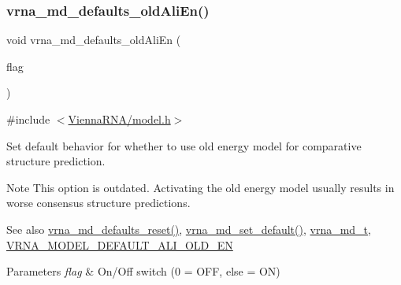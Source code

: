 \subsubsection{\texorpdfstring{vrna\+\_\+md\+\_\+defaults\+\_\+old\+Ali\+En()}{vrna\_md\_defaults\_oldAliEn()}}
{\footnotesize\ttfamily void vrna\+\_\+md\+\_\+defaults\+\_\+old\+Ali\+En (\begin{DoxyParamCaption}\item[{int}]{flag }\end{DoxyParamCaption})}



{\ttfamily \#include $<$\mbox{\hyperlink{model_8h}{Vienna\+R\+N\+A/model.\+h}}$>$}



Set default behavior for whether to use old energy model for comparative structure prediction. 

\begin{DoxyNote}{Note}
This option is outdated. Activating the old energy model usually results in worse consensus structure predictions. 
\end{DoxyNote}
\begin{DoxySeeAlso}{See also}
\mbox{\hyperlink{group__model__details_ga70834424cf804d149937de89f80ceb45}{vrna\+\_\+md\+\_\+defaults\+\_\+reset()}}, \mbox{\hyperlink{group__model__details_ga8ac6ff84936282436f822644bf841f66}{vrna\+\_\+md\+\_\+set\+\_\+default()}}, \mbox{\hyperlink{group__model__details_ga1f8a10e12a0a1915f2a4eff0b28ea17c}{vrna\+\_\+md\+\_\+t}}, \mbox{\hyperlink{group__model__details_ga2a5bbfc1edf33077e39466d2d9807115}{V\+R\+N\+A\+\_\+\+M\+O\+D\+E\+L\+\_\+\+D\+E\+F\+A\+U\+L\+T\+\_\+\+A\+L\+I\+\_\+\+O\+L\+D\+\_\+\+EN}} 
\end{DoxySeeAlso}

\begin{DoxyParams}{Parameters}
{\em flag} & On/\+Off switch (0 = O\+FF, else = ON) \\
\hline
\end{DoxyParams}
\mbox{\label{group__model__details_ga2374492b5019df88022fe4c05f0f3630}} 
